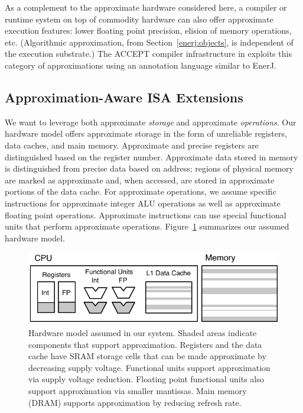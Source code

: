 As a complement to the approximate hardware considered here, a compiler or runtime system on top of commodity hardware can also
offer approximate execution features: lower floating point
precision, elision of memory operations, etc.
(Algorithmic approximation, from
Section~\ref{enerj:objects}, is independent of the
execution substrate.)
The ACCEPT compiler infrastructure in  exploits this
category of approximations using an annotation language similar to EnerJ.

\subsection{Approximation-Aware ISA Extensions}
\label{enerj:sec:isa}

We want to leverage both approximate {\em storage} and
approximate {\em operations}.  Our hardware model offers approximate
storage in the form of unreliable registers, data caches, and main
memory. Approximate and precise registers are distinguished based on
the register number. Approximate data stored in memory is
distinguished from precise data based on address; regions of physical
memory are marked as approximate and, when accessed, are stored in
approximate portions of the data cache. For approximate operations,
we assume specific instructions for approximate
integer ALU operations as well as approximate floating point
operations. Approximate instructions can use special functional units that
perform approximate operations. Figure~\ref{enerj:fig:hwmodel} summarizes
our assumed hardware model.

\begin{figure}[t]
  \centering
    \includegraphics[width=0.85\columnwidth]{figs/hwmodel.pdf}
      \caption{Hardware model assumed in our system. Shaded areas indicate
        components that support approximation.
        Registers and the data cache have SRAM storage cells that
        can be made approximate by decreasing supply voltage.
        Functional units support approximation via supply voltage
        reduction. Floating point functional units also support approximation
        via smaller
        mantissas. Main memory (DRAM) supports approximation by reducing
        refresh rate.\label{enerj:fig:hwmodel}}
\end{figure}

